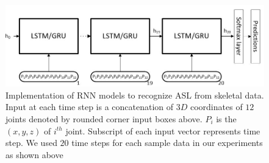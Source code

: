 \documentclass[10pt,twocolumn,letterpaper]{article}
\begin{document}
\begin{figure}[h]
	\begin{center}
		\includegraphics[width=.8\linewidth]{rnn_impl}
	\end{center}
	\caption{Implementation of RNN models to recognize ASL from skeletal data. Input at each time step is a concatenation of $3D$ coordinates of $12$ joints denoted by rounded corner input boxes above. $P_i$ is the $(x, y, z)$ of $i^{th}$ joint. Subscript of each input vector represents time step. We used $20$ time steps for each sample data in our experiments as shown above}
	\label{fig:rnn_impl}
\end{figure}
\end{document}
